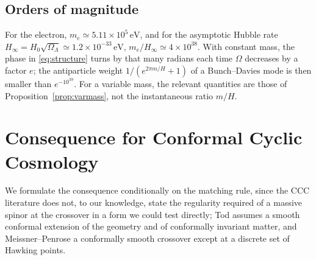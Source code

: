 \documentclass[11pt,a4paper]{article}
\theoremstyle{definition}
\begin{document}
\subsection{Orders of magnitude}

For the electron, $m_{e}\simeq5.11\times10^{5}\,\mathrm{eV}$, and for the asymptotic Hubble rate $H_{\infty}=H_{0}\sqrt{\Omega_{\Lambda}}\simeq1.2\times10^{-33}\,\mathrm{eV}$, $m_{e}/H_{\infty}\simeq4\times10^{38}$. With constant mass, the phase in \eqref{eq:structure} turns by that many radians each time $\Omega$ decreases by a factor $e$; the antiparticle weight $1/(e^{2\pi m/H}+1)$ of a Bunch--Davies mode is then smaller than $e^{-10^{39}}$. For a variable mass, the relevant quantities are those of Proposition~\ref{prop:varmass}, not the instantaneous ratio $m/H$.

\section{Consequence for Conformal Cyclic Cosmology}
\label{sec:ccc}

We formulate the consequence conditionally on the matching rule, since the CCC literature does not, to our knowledge, state the regularity required of a massive spinor at the crossover in a form we could test directly; Tod \cite{Tod2015} assumes a smooth conformal extension of the geometry and of conformally invariant matter, and Meissner--Penrose \cite{MeissnerPenrose2025} a conformally smooth crossover except at a discrete set of Hawking points.
\end{document}

